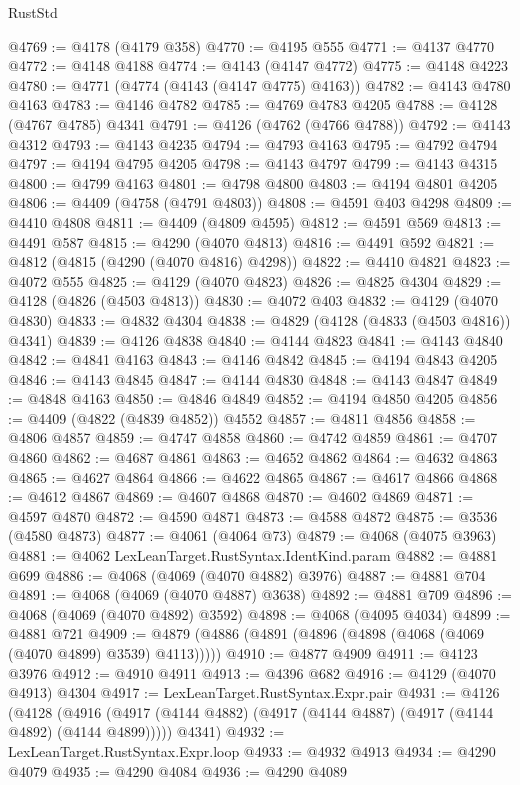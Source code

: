 \begin{lexlean}{RustStd}
\begin{coremodule}
@4769 := @4178 (@4179 @358)
@4770 := @4195 @555
@4771 := @4137 @4770
@4772 := @4148 @4188
@4774 := @4143 (@4147 @4772)
@4775 := @4148 @4223
@4780 := @4771 (@4774 (@4143 (@4147 @4775) @4163))
@4782 := @4143 @4780 @4163
@4783 := @4146 @4782
@4785 := @4769 @4783 @4205
@4788 := @4128 (@4767 @4785) @4341
@4791 := @4126 (@4762 (@4766 @4788))
@4792 := @4143 @4312
@4793 := @4143 @4235
@4794 := @4793 @4163
@4795 := @4792 @4794
@4797 := @4194 @4795 @4205
@4798 := @4143 @4797
@4799 := @4143 @4315
@4800 := @4799 @4163
@4801 := @4798 @4800
@4803 := @4194 @4801 @4205
@4806 := @4409 (@4758 (@4791 @4803))
@4808 := @4591 @403 @4298
@4809 := @4410 @4808
@4811 := @4409 (@4809 @4595)
@4812 := @4591 @569
@4813 := @4491 @587
@4815 := @4290 (@4070 @4813)
@4816 := @4491 @592
@4821 := @4812 (@4815 (@4290 (@4070 @4816) @4298))
@4822 := @4410 @4821
@4823 := @4072 @555
@4825 := @4129 (@4070 @4823)
@4826 := @4825 @4304
@4829 := @4128 (@4826 (@4503 @4813))
@4830 := @4072 @403
@4832 := @4129 (@4070 @4830)
@4833 := @4832 @4304
@4838 := @4829 (@4128 (@4833 (@4503 @4816)) @4341)
@4839 := @4126 @4838
@4840 := @4144 @4823
@4841 := @4143 @4840
@4842 := @4841 @4163
@4843 := @4146 @4842
@4845 := @4194 @4843 @4205
@4846 := @4143 @4845
@4847 := @4144 @4830
@4848 := @4143 @4847
@4849 := @4848 @4163
@4850 := @4846 @4849
@4852 := @4194 @4850 @4205
@4856 := @4409 (@4822 (@4839 @4852)) @4552
@4857 := @4811 @4856
@4858 := @4806 @4857
@4859 := @4747 @4858
@4860 := @4742 @4859
@4861 := @4707 @4860
@4862 := @4687 @4861
@4863 := @4652 @4862
@4864 := @4632 @4863
@4865 := @4627 @4864
@4866 := @4622 @4865
@4867 := @4617 @4866
@4868 := @4612 @4867
@4869 := @4607 @4868
@4870 := @4602 @4869
@4871 := @4597 @4870
@4872 := @4590 @4871
@4873 := @4588 @4872
@4875 := @3536 (@4580 @4873)
@4877 := @4061 (@4064 @73)
@4879 := @4068 (@4075 @3963)
@4881 := @4062 LexLeanTarget.RustSyntax.IdentKind.param
@4882 := @4881 @699
@4886 := @4068 (@4069 (@4070 @4882) @3976)
@4887 := @4881 @704
@4891 := @4068 (@4069 (@4070 @4887) @3638)
@4892 := @4881 @709
@4896 := @4068 (@4069 (@4070 @4892) @3592)
@4898 := @4068 (@4095 @4034)
@4899 := @4881 @721
@4909 := @4879 (@4886 (@4891 (@4896 (@4898 (@4068 (@4069 (@4070 @4899) @3539) @4113)))))
@4910 := @4877 @4909
@4911 := @4123 @3976
@4912 := @4910 @4911
@4913 := @4396 @682
@4916 := @4129 (@4070 @4913) @4304
@4917 := LexLeanTarget.RustSyntax.Expr.pair
@4931 := @4126
    (@4128
      (@4916 (@4917 (@4144 @4882) (@4917 (@4144 @4887) (@4917 (@4144 @4892) (@4144 @4899)))))
      @4341)
@4932 := LexLeanTarget.RustSyntax.Expr.loop
@4933 := @4932 @4913
@4934 := @4290 @4079
@4935 := @4290 @4084
@4936 := @4290 @4089

\end{coremodule}
\end{lexlean}
